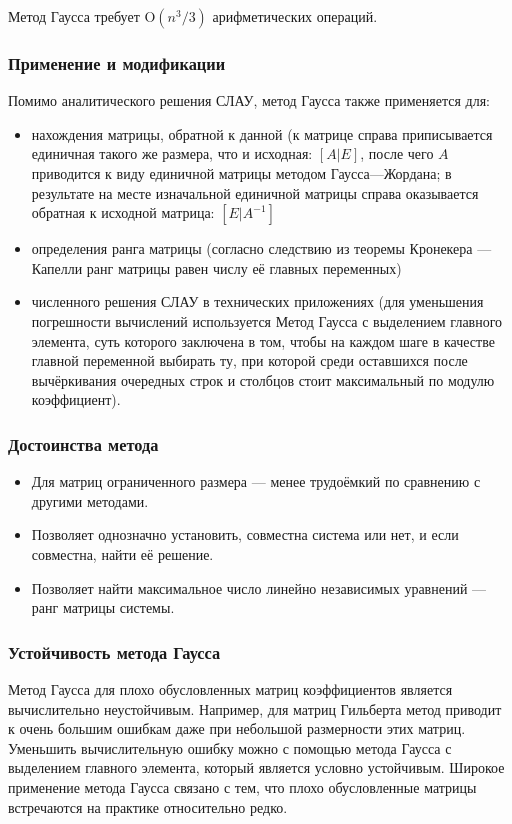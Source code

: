 \documentclass[a4paper]{article}
\begin{document}
Метод Гаусса требует $\mathrm{O}(n^3 / 3)$ арифметических операций.

\subsubsection{Применение и модификации}

Помимо аналитического решения СЛАУ, метод Гаусса также применяется для:

\begin{itemize}
 \item нахождения матрицы, обратной к данной (к матрице справа приписывается единичная такого же размера, что и исходная: $[A | E]$, после чего $A$ приводится к виду единичной матрицы методом Гаусса—Жордана; в результате на месте изначальной единичной матрицы справа оказывается обратная к исходной матрица: $[E | A^{-1}]$
 \item определения ранга матрицы (согласно следствию из теоремы Кронекера — Капелли ранг матрицы равен числу её главных переменных)
 \item численного решения СЛАУ в технических приложениях (для уменьшения погрешности вычислений используется Метод Гаусса с выделением главного элемента, суть которого заключена в том, чтобы на каждом шаге в качестве главной переменной выбирать ту, при которой среди оставшихся после вычёркивания очередных строк и столбцов стоит максимальный по модулю коэффициент).
\end{itemize}

\subsubsection{Достоинства метода}

\begin{itemize}
 \item Для матриц ограниченного размера — менее трудоёмкий по сравнению с другими методами.
 \item Позволяет однозначно установить, совместна система или нет, и если совместна, найти её решение.
 \item Позволяет найти максимальное число линейно независимых уравнений — ранг матрицы системы.
\end{itemize}

\subsubsection{Устойчивость метода Гаусса}

Метод Гаусса для плохо обусловленных матриц коэффициентов является вычислительно неустойчивым. Например, для матриц Гильберта метод приводит к очень большим ошибкам даже при небольшой размерности этих матриц. Уменьшить вычислительную ошибку можно с помощью метода Гаусса с выделением главного элемента, который является условно устойчивым. Широкое применение метода Гаусса связано с тем, что плохо обусловленные матрицы встречаются на практике относительно редко.
\end{document}
